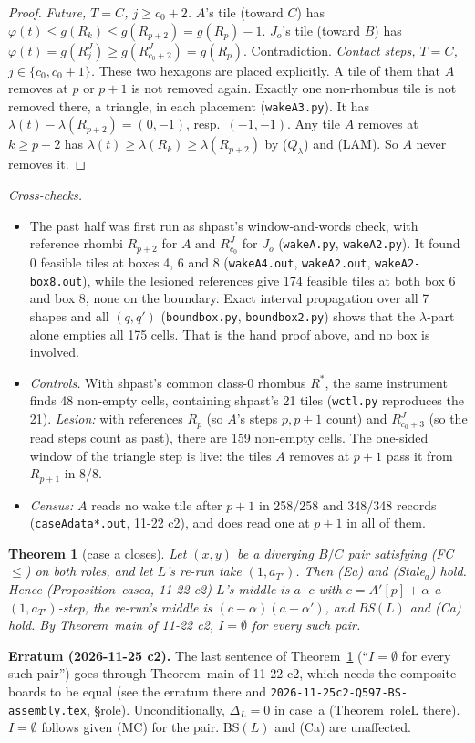 \documentclass[11pt]{article}
\newtheorem{theorem}{Theorem}\newtheorem{lemma}[theorem]{Lemma}\newtheorem{proposition}[theorem]{Proposition}
\theoremstyle{definition}\newtheorem{definition}[theorem]{Definition}\newtheorem{remark}[theorem]{Remark}
\begin{document}
\begin{proof}
\emph{Future, $T=C$, $j\ge c_0+2$.} $A$'s tile (toward $C$) has $\varphi(t)\le g(R_k)\le g(R_{p+2})=g(R_p)-1$. $J_o$'s tile (toward $B$) has $\varphi(t)=g(R^J_j)\ge g(R^J_{c_0+2})=g(R_p)$. Contradiction.
\emph{Contact steps, $T=C$, $j\in\{c_0,c_0+1\}$.} These two hexagons are placed explicitly. A tile of them that $A$ removes at $p$ or $p+1$ is not removed again. Exactly one non-rhombus tile is not removed there, a triangle, in each placement (\texttt{wakeA3.py}). It has $\lambda(t)-\lambda(R_{p+2})=(0,-1)$, resp.\ $(-1,-1)$. Any tile $A$ removes at $k\ge p+2$ has $\lambda(t)\ge\lambda(R_k)\ge\lambda(R_{p+2})$ by ($Q_\lambda$) and (LAM). So $A$ never removes it.
\end{proof}
\noindent\emph{Cross-checks.}
\begin{itemize}
\item The past half was first run as shpast's window-and-words check, with reference rhombi $R_{p+2}$ for $A$ and $R^J_{c_0}$ for $J_o$ (\texttt{wakeA.py}, \texttt{wakeA2.py}). It found 0 feasible tiles at boxes 4, 6 and 8 (\texttt{wakeA4.out}, \texttt{wakeA2.out}, \texttt{wakeA2-box8.out}), while the lesioned references give 174 feasible tiles at both box 6 and box 8, none on the boundary. Exact interval propagation over all 7 shapes and all $(q,q')$ (\texttt{boundbox.py}, \texttt{boundbox2.py}) shows that the $\lambda$-part alone empties all 175 cells. That is the hand proof above, and no box is involved.
\item \emph{Controls.} With shpast's common class-0 rhombus $R^\ast$, the same instrument finds 48 non-empty cells, containing shpast's 21 tiles (\texttt{wctl.py} reproduces the 21). \emph{Lesion:} with references $R_p$ (so $A$'s steps $p,p+1$ count) and $R^J_{c_0+3}$ (so the read steps count as past), there are 159 non-empty cells. The one-sided window of the triangle step is live: the tiles $A$ removes at $p+1$ pass it from $R_{p+1}$ in 8/8.
\item \emph{Census:} $A$ reads no wake tile after $p+1$ in 258/258 and 348/348 records (\texttt{caseAdata*.out}, 11-22 c2), and does read one at $p+1$ in all of them.
\end{itemize}

\begin{theorem}[case a closes]\label{thm:casea}
Let $(x,y)$ be a diverging $B/C$ pair satisfying (FC$\le$) on both roles, and let $L$'s re-run take $(1,a_{T'})$. Then (Ea) and (Stale$_a$) hold. Hence (Proposition~casea, 11-22 c2) $L$'s middle is $a\cdot c$ with $c=A'[p]+\alpha$ a $(1,a_{T'})$-step, the re-run's middle is $(c-\alpha)(a+\alpha')$, and BS$(L)$ and (Ca) hold. By Theorem~main of 11-22 c2, $I=\emptyset$ for every such pair.
\end{theorem}
\noindent\textbf{Erratum (2026-11-25 c2).} The last sentence of Theorem~\ref{thm:casea} (``$I=\emptyset$ for every such pair'') goes through Theorem~main of 11-22 c2, which needs the composite boards to be equal (see the erratum there and \texttt{2026-11-25c2-Q597-BS-assembly.tex}, \S role). Unconditionally, $\Delta_L=0$ in case~a (Theorem~roleL there). $I=\emptyset$ follows given (MC) for the pair. BS$(L)$ and (Ca) are unaffected.
\end{document}
